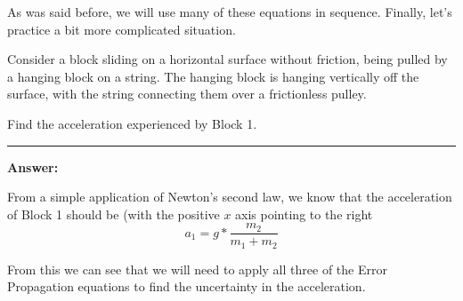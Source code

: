 \documentclass{article}
\begin{document}
As was said before, we will use many of these equations in sequence. Finally, let's practice a bit more complicated situation.

\newpage
\begin{example}
  Consider a block sliding on a horizontal surface without friction, being pulled by a hanging block on a string. The hanging block is hanging vertically off the surface, with the string connecting them over a frictionless pulley.

  Find the acceleration experienced by Block 1.
  \begin{figure}[H]
    \centering
  \end{figure}

  \medskip
  \hrule
  \medskip

  \textbf{Answer:}

  From a simple application of Newton's second law, we know that the acceleration of Block 1 should be (with the positive $x$ axis pointing to the right
    \begin{equation}
      a_1=g*\frac{m_2}{m_1+m_2}\label{eq:blockq}
    \end{equation}

    From this we can see that we will need to apply all three of the Error Propagation equations to find the uncertainty in the acceleration.


\end{example}
\end{document}
